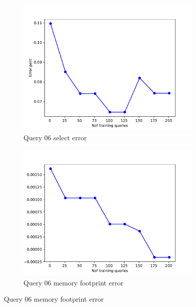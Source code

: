 \begin{figure}[!htb]
    \begin{subfigure}[t]{0.5\textwidth}
      \includegraphics[scale=0.4]{figs/tpch10/tpch10_sel06_error.pdf}
      \caption{Query 06 select error}
      \label{fig:tpch_sel06}
     \end{subfigure}
     \begin{subfigure}[t]{0.5\textwidth}
       \includegraphics[scale=0.4]{figs/tpch10/tpch10_q06_memerror.pdf}
       \caption{Query 06 memory footprint error}
       \label{fig:tpch_mem06}
     \end{subfigure}


\end{figure}
